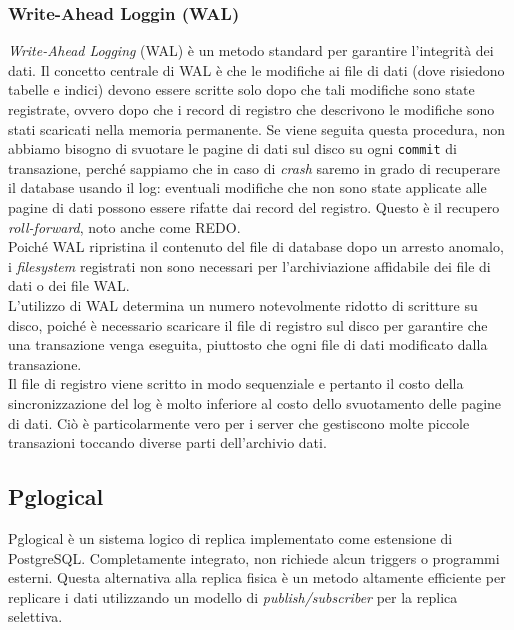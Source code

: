 \item
\subsubsection{Write-Ahead Loggin (WAL)}
\textit{Write-Ahead Logging} (WAL) \`{e} un metodo standard per garantire l'integrit\`{a} dei dati. Il concetto centrale di WAL \`{e} che le modifiche ai file di dati (dove risiedono tabelle e indici) devono essere scritte solo dopo che tali modifiche sono state registrate, ovvero dopo che i record di registro che descrivono le modifiche sono stati scaricati nella memoria permanente. Se viene seguita questa procedura, non abbiamo bisogno di svuotare le pagine di dati sul disco su ogni \verb"commit" di transazione, perch\'{e} sappiamo che in caso di \textit{crash} saremo in grado di recuperare il database usando il log: eventuali modifiche che non sono state applicate alle pagine di dati possono essere rifatte dai record del registro. Questo \`{e} il recupero \textit{roll-forward}, noto anche come REDO.\\

Poich\'{e} WAL ripristina il contenuto del file di database dopo un arresto anomalo, i \textit{filesystem} registrati non sono necessari per l'archiviazione affidabile dei file di dati o dei file WAL. \\
L'utilizzo di WAL determina un numero notevolmente ridotto di scritture su disco, poich\'{e} \`{e} necessario scaricare il file di registro sul disco per garantire che una transazione venga eseguita, piuttosto che ogni file di dati modificato dalla transazione. \\
Il file di registro viene scritto in modo sequenziale e pertanto il costo della sincronizzazione del log \`{e} molto inferiore al costo dello svuotamento delle pagine di dati. Ci\`{o} \`{e} particolarmente vero per i server che gestiscono molte piccole transazioni toccando diverse parti dell'archivio dati.\cite{etichetta15}
 
\item
\subsection{Pglogical}
Pglogical \`{e} un sistema logico di replica implementato come estensione di PostgreSQL. Completamente integrato, non richiede alcun triggers o programmi esterni. Questa alternativa alla replica fisica \`{e} un metodo altamente efficiente per replicare i dati utilizzando un modello di \textit{publish/subscriber} per la replica selettiva.\cite{etichetta3}

